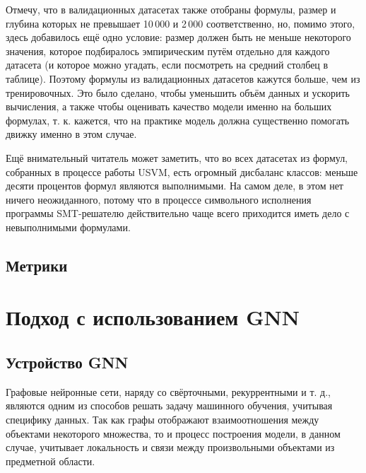 Отмечу, что в валидационных датасетах также отобраны формулы, размер и глубина которых не превышает 10\,000 и 2\,000 соответственно, но, помимо этого, здесь добавилось ещё одно условие: размер должен быть не меньше некоторого значения, которое подбиралось эмпирическим путём отдельно для каждого датасета (и которое можно угадать, если посмотреть на средний столбец в таблице). Поэтому формулы из валидационных датасетов кажутся больше, чем из тренировочных. Это было сделано, чтобы уменьшить объём данных и ускорить вычисления, а также чтобы оценивать качество модели именно на больших формулах, т. к. кажется, что на практике модель должна существенно помогать движку именно в этом случае.

Ещё внимательный читатель может заметить, что во всех датасетах из формул, собранных в процессе работы USVM, есть огромный дисбаланс классов: меньше десяти процентов формул являются выполнимыми. На самом деле, в этом нет ничего неожиданного, потому что в процессе символьного исполнения программы SMT-решателю действительно чаще всего приходится иметь дело с невыполнимыми формулами.


\subsection{Метрики}



\section{Подход с использованием GNN}

\subsection{Устройство GNN} \label{gnn-architecture}

Графовые нейронные сети, наряду со свёрточными, рекуррентными и т. д., являются одним из способов решать задачу машинного обучения, учитывая специфику данных. Так как графы отображают взаимоотношения между объектами некоторого множества, то и процесс построения модели, в данном случае, учитывает локальность и связи между произвольными объектами из предметной области.

